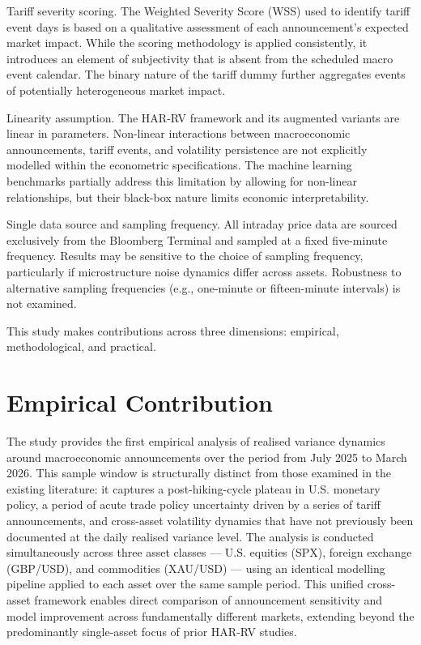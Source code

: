 \documentclass[12pt,a4paper]{report}
\begin{document}
Tariff severity scoring. The Weighted Severity Score (WSS) used to identify tariff event days is based on a qualitative assessment of each announcement's expected market impact. While the scoring methodology is applied consistently, it introduces an element of subjectivity that is absent from the scheduled macro event calendar. The binary nature of the tariff dummy further aggregates events of potentially heterogeneous market impact.

Linearity assumption. The HAR-RV framework and its augmented variants are linear in parameters. Non-linear interactions between macroeconomic announcements, tariff events, and volatility persistence are not explicitly modelled within the econometric specifications. The machine learning benchmarks partially address this limitation by allowing for non-linear relationships, but their black-box nature limits economic interpretability.

Single data source and sampling frequency. All intraday price data are sourced exclusively from the Bloomberg Terminal and sampled at a fixed five-minute frequency. Results may be sensitive to the choice of sampling frequency, particularly if microstructure noise dynamics differ across assets. Robustness to alternative sampling frequencies (e.g., one-minute or fifteen-minute intervals) is not examined.

This study makes contributions across three dimensions: empirical, methodological, and practical.

\section{Empirical Contribution}
The study provides the first empirical analysis of realised variance dynamics around macroeconomic announcements over the period from July 2025 to March 2026. This sample window is structurally distinct from those examined in the existing literature: it captures a post-hiking-cycle plateau in U.S. monetary policy, a period of acute trade policy uncertainty driven by a series of tariff announcements, and cross-asset volatility dynamics that have not previously been documented at the daily realised variance level. The analysis is conducted simultaneously across three asset classes --- U.S. equities (SPX), foreign exchange (GBP/USD), and commodities (XAU/USD) --- using an identical modelling pipeline applied to each asset over the same sample period. This unified cross-asset framework enables direct comparison of announcement sensitivity and model improvement across fundamentally different markets, extending beyond the predominantly single-asset focus of prior HAR-RV studies.
\end{document}
